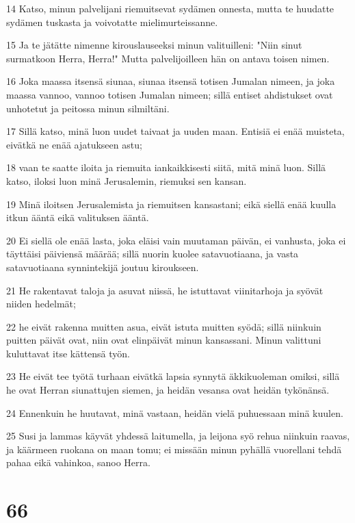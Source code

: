 \par 14 Katso, minun palvelijani riemuitsevat sydämen onnesta, mutta te huudatte sydämen tuskasta ja voivotatte mielimurteissanne.
\par 15 Ja te jätätte nimenne kirouslauseeksi minun valituilleni: "Niin sinut surmatkoon Herra, Herra!" Mutta palvelijoilleen hän on antava toisen nimen.
\par 16 Joka maassa itsensä siunaa, siunaa itsensä totisen Jumalan nimeen, ja joka maassa vannoo, vannoo totisen Jumalan nimeen; sillä entiset ahdistukset ovat unhotetut ja peitossa minun silmiltäni.
\par 17 Sillä katso, minä luon uudet taivaat ja uuden maan. Entisiä ei enää muisteta, eivätkä ne enää ajatukseen astu;
\par 18 vaan te saatte iloita ja riemuita iankaikkisesti siitä, mitä minä luon. Sillä katso, iloksi luon minä Jerusalemin, riemuksi sen kansan.
\par 19 Minä iloitsen Jerusalemista ja riemuitsen kansastani; eikä siellä enää kuulla itkun ääntä eikä valituksen ääntä.
\par 20 Ei siellä ole enää lasta, joka eläisi vain muutaman päivän, ei vanhusta, joka ei täyttäisi päiviensä määrää; sillä nuorin kuolee satavuotiaana, ja vasta satavuotiaana synnintekijä joutuu kiroukseen.
\par 21 He rakentavat taloja ja asuvat niissä, he istuttavat viinitarhoja ja syövät niiden hedelmät;
\par 22 he eivät rakenna muitten asua, eivät istuta muitten syödä; sillä niinkuin puitten päivät ovat, niin ovat elinpäivät minun kansassani. Minun valittuni kuluttavat itse kättensä työn.
\par 23 He eivät tee työtä turhaan eivätkä lapsia synnytä äkkikuoleman omiksi, sillä he ovat Herran siunattujen siemen, ja heidän vesansa ovat heidän tykönänsä.
\par 24 Ennenkuin he huutavat, minä vastaan, heidän vielä puhuessaan minä kuulen.
\par 25 Susi ja lammas käyvät yhdessä laitumella, ja leijona syö rehua niinkuin raavas, ja käärmeen ruokana on maan tomu; ei missään minun pyhällä vuorellani tehdä pahaa eikä vahinkoa, sanoo Herra.

\chapter{66}

